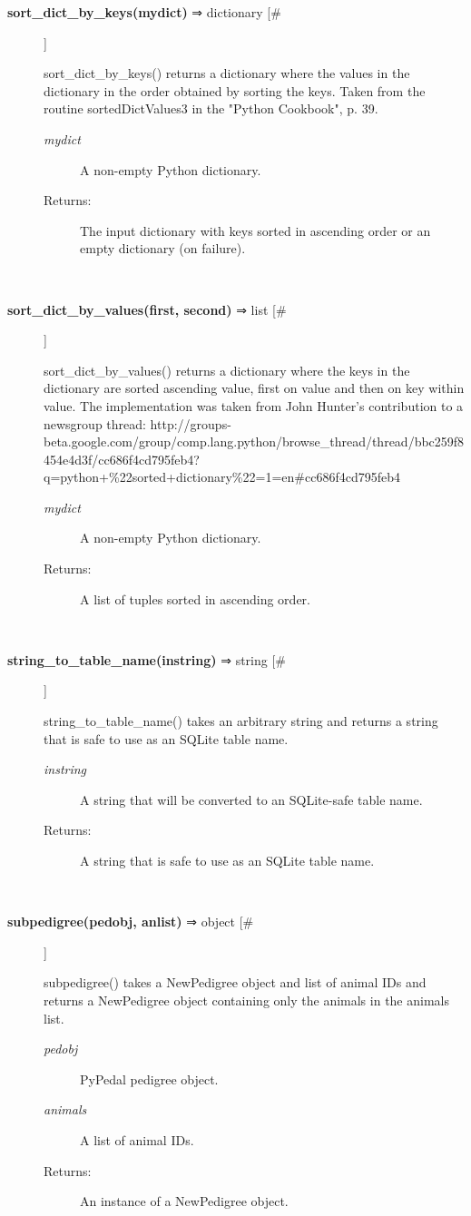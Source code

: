 \documentclass{article}
\begin{document}
\begin{description}
\item[\textbf{sort\_dict\_by\_keys(mydict)} ⇒ dictionary [\#]
]
\par sort\_dict\_by\_keys() returns a dictionary where the values in the dictionary
in the order obtained by sorting the keys.  Taken from the routine sortedDictValues3
in the "Python Cookbook", p. 39.
\begin{description}
\item[\textit{mydict}
]
A non-empty Python dictionary.
\item[Returns:
]
The input dictionary with keys sorted in ascending order or an empty dictionary (on failure).
\end{description}\\

\item[\textbf{sort\_dict\_by\_values(first, second)} ⇒ list [\#]
]
\par sort\_dict\_by\_values() returns a dictionary where the keys in the dictionary
are sorted ascending value, first on value and then on key within value.  The
implementation was taken from John Hunter's contribution to a newsgroup thread:
http://groups-beta.google.com/group/comp.lang.python/browse\_thread/thread/bbc259f8454e4d3f/cc686f4cd795feb4?q=python+\%22sorted+dictionary\%22=1=en\#cc686f4cd795feb4
\begin{description}
\item[\textit{mydict}
]
A non-empty Python dictionary.
\item[Returns:
]
A list of tuples sorted in ascending order.
\end{description}\\

\item[\textbf{string\_to\_table\_name(instring)} ⇒ string [\#]
]
\par string\_to\_table\_name() takes an arbitrary string and returns a string that
is safe to use as an SQLite table name.
\begin{description}
\item[\textit{instring}
]
A string that will be converted to an SQLite-safe table name.
\item[Returns:
]
A string that is safe to use as an SQLite table name.
\end{description}\\

\item[\textbf{subpedigree(pedobj, anlist)} ⇒ object [\#]
]
\par subpedigree() takes a NewPedigree object and list of animal
IDs and returns a NewPedigree object containing only the
animals in the animals list.
\begin{description}
\item[\textit{pedobj}
]
PyPedal pedigree object.
\item[\textit{animals}
]
A list of animal IDs.
\item[Returns:
]
An instance of a NewPedigree object.
\end{description}\\


\end{description}
\end{document}
